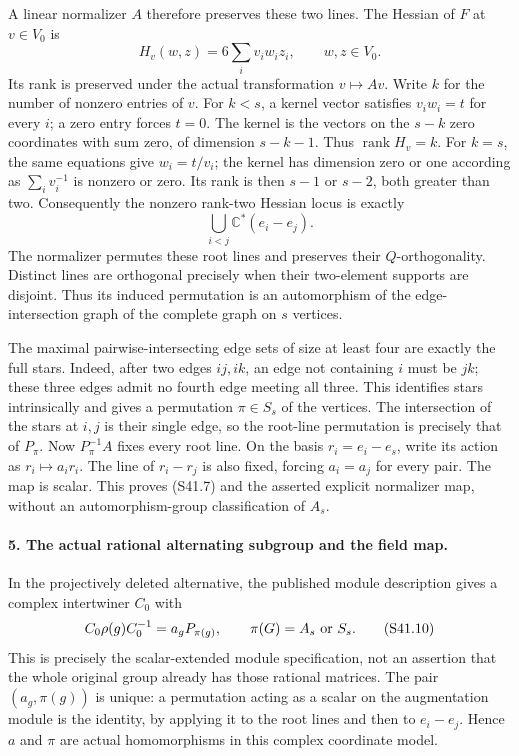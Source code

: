 A linear normalizer \(A\) therefore preserves these two
lines. The Hessian of \(F\) at \(v\in V_0\) is
\[
                 H_v(w,z)=6\sum_i v_iw_iz_i,
                                \qquad w,z\in V_0.         \tag{S41.8}
\]
Its rank is preserved under the actual transformation \(v\mapsto Av\).
Write \(k\) for the number of nonzero entries of \(v\).
For \(k<s\), a kernel vector satisfies
\(v_iw_i=t\) for every \(i\); a zero entry forces
\(t=0\). The kernel is the vectors on the \(s-k\)
zero coordinates with sum zero, of dimension \(s-k-1\).
Thus \(\operatorname{rank}H_v=k\). For \(k=s\), the
same equations give \(w_i=t/v_i\); the kernel has dimension
zero or one according as \(\sum_i v_i^{-1}\) is nonzero
or zero. Its rank is then \(s-1\) or \(s-2\), both
greater than two. Consequently the nonzero rank-two Hessian
locus is exactly
\[
                 \bigcup_{i<j}\mathbb C^*(e_i-e_j).       \tag{S41.9}
\]
The normalizer permutes these root lines and preserves their
\(Q\)-orthogonality. Distinct lines are orthogonal precisely
when their two-element supports are disjoint. Thus its induced
permutation is an automorphism of the edge-intersection graph
of the complete graph on \(s\) vertices.

The maximal pairwise-intersecting edge sets of size at least
four are exactly the full stars. Indeed, after two edges
\(ij,ik\), an edge not containing \(i\) must be \(jk\);
these three edges admit no fourth edge meeting all three.
This identifies stars intrinsically and gives a permutation
\(\pi\in S_s\) of the vertices. The intersection of the
stars at \(i,j\) is their single edge, so the root-line
permutation is precisely that of \(P_\pi\).
Now \(P_\pi^{-1}A\) fixes every root line. On the basis
\(r_i=e_i-e_s\), write its action as \(r_i\mapsto a_i r_i\).
The line of \(r_i-r_j\) is also fixed, forcing
\(a_i=a_j\) for every pair. The map is scalar. This proves
(S41.7) and the asserted explicit normalizer map, without an
automorphism-group classification of \(A_s\).

\paragraph{5. The actual rational alternating subgroup and the field map.}
In the projectively deleted alternative, the published module
description gives a complex intertwiner \(C_0\) with
\[
 C_0\rho(g)C_0^{-1}=a_gP_{\pi(g)},\qquad
            \pi(G)=A_s\ \hbox{or}\ S_s.                   \tag{S41.10}
\]
This is precisely the scalar-extended module specification,
not an assertion that the whole original group already has
those rational matrices. The pair \((a_g,\pi(g))\) is
unique: a permutation acting as a scalar on the augmentation
module is the identity, by applying it to the root lines and
then to \(e_i-e_j\). Hence \(a\) and \(\pi\) are
actual homomorphisms in this complex coordinate model.

